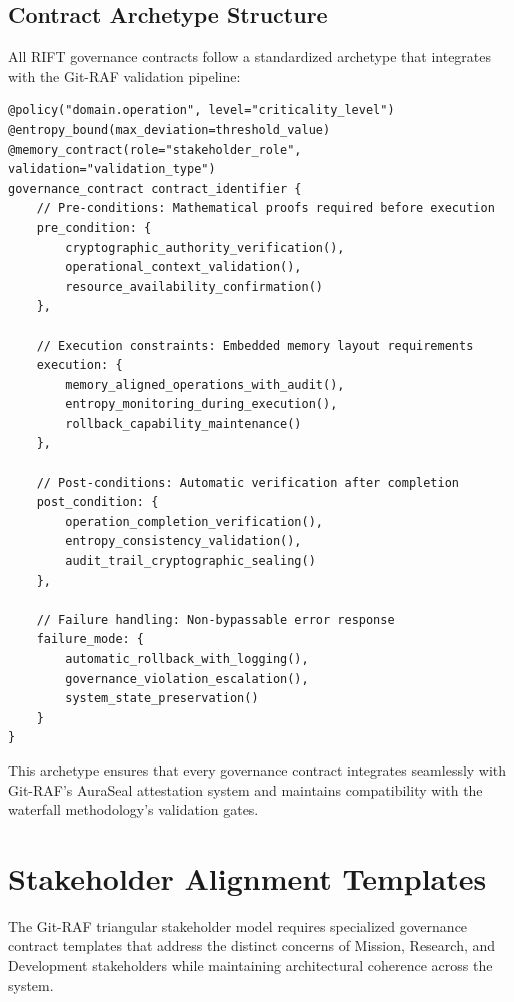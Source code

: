 \documentclass[11pt,letterpaper]{article}
\begin{document}
\subsection{Contract Archetype Structure}

All RIFT governance contracts follow a standardized archetype that integrates with the Git-RAF validation pipeline:

\begin{lstlisting}[language=rift, caption=Base Governance Contract Archetype]
@policy("domain.operation", level="criticality_level")
@entropy_bound(max_deviation=threshold_value)
@memory_contract(role="stakeholder_role", validation="validation_type")
governance_contract contract_identifier {
    // Pre-conditions: Mathematical proofs required before execution
    pre_condition: {
        cryptographic_authority_verification(),
        operational_context_validation(),
        resource_availability_confirmation()
    },
    
    // Execution constraints: Embedded memory layout requirements
    execution: {
        memory_aligned_operations_with_audit(),
        entropy_monitoring_during_execution(),
        rollback_capability_maintenance()
    },
    
    // Post-conditions: Automatic verification after completion
    post_condition: {
        operation_completion_verification(),
        entropy_consistency_validation(),
        audit_trail_cryptographic_sealing()
    },
    
    // Failure handling: Non-bypassable error response
    failure_mode: {
        automatic_rollback_with_logging(),
        governance_violation_escalation(),
        system_state_preservation()
    }
}
\end{lstlisting}

This archetype ensures that every governance contract integrates seamlessly with Git-RAF's AuraSeal attestation system and maintains compatibility with the waterfall methodology's validation gates.

\section{Stakeholder Alignment Templates}

The Git-RAF triangular stakeholder model requires specialized governance contract templates that address the distinct concerns of Mission, Research, and Development stakeholders while maintaining architectural coherence across the system.
\end{document}
